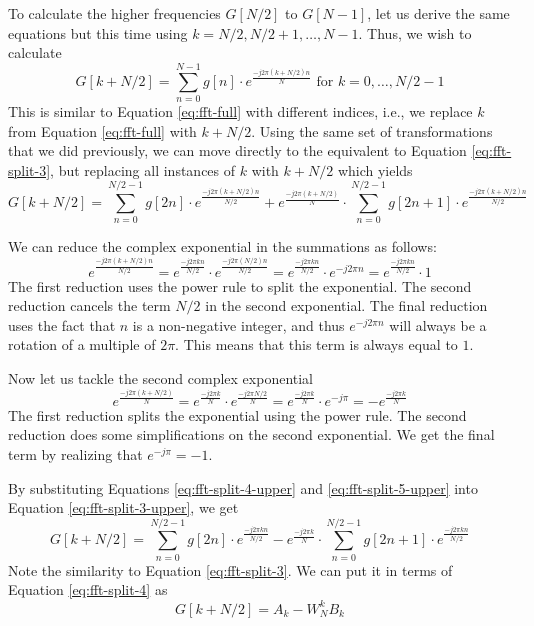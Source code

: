 To calculate the higher frequencies $G[N/2]$ to $G[N-1]$, let us derive the same equations but this time using $k = N/2, N/2 + 1, \dots, N -1$.  Thus, we wish to calculate
\begin{equation}
G[k + N/2] = \displaystyle\sum\limits_{n=0}^{N-1} g[n] \cdot e^{\frac{-j 2 \pi (k + N/2) n}{N}} \text{ for } k = 0, \dots, N/2 - 1
\label{eq:fft-upper}
\end{equation}
This is similar to Equation \ref{eq:fft-full} with different indices, i.e., we replace $k$ from Equation \ref{eq:fft-full} with $k + N/2$. Using the same set of transformations that we did previously, we can move directly to the equivalent to Equation \ref{eq:fft-split-3}, but replacing all instances of $k$ with $k + N/2$ which yields 
\begin{equation}
G[k + N/2] = \displaystyle\sum\limits_{n=0}^{N/2-1} g[2n] \cdot e^{\frac{-j 2 \pi (k + N/2) n}{N/2}} + e^{\frac{-j 2 \pi (k + N/2)}{N}} \cdot \displaystyle\sum\limits_{n=0}^{N/2-1} g[2n+1] \cdot e^{\frac{-j 2 \pi (k + N/2) n}{N/2}} 
\label{eq:fft-split-3-upper}
\end{equation}

We can reduce the complex exponential in the summations as follows:
\begin{equation}
e^{\frac{-j 2 \pi (k + N/2) n}{N/2}} = e^{\frac{-j 2 \pi k n}{N/2}} \cdot e^{\frac{-j 2 \pi (N/2) n}{N/2}} = e^{\frac{-j 2 \pi k n}{N/2}} \cdot e^{-j 2 \pi n} = e^{\frac{-j 2 \pi k n}{N/2}} \cdot 1
\label{eq:fft-split-4-upper}
\end{equation}
The first reduction uses the power rule to split the exponential. The second reduction cancels the term $N/2$ in the second exponential. The final reduction uses the fact that $n$ is a non-negative integer, and thus $e^{-j 2 \pi n}$ will always be a rotation of a multiple of $2 \pi$. This means that this term is always equal to $1$. 

Now let us tackle the second complex exponential
\begin{equation}
e^{\frac{-j 2 \pi (k + N/2)}{N}} = e^{\frac{-j 2 \pi k }{N}} \cdot e^{\frac{-j 2 \pi N/2 }{N}} = e^{\frac{-j 2 \pi k }{N}} \cdot e^{-j  \pi} = - e^{\frac{-j 2 \pi k }{N}}
\label{eq:fft-split-5-upper}
\end{equation}
The first reduction splits the exponential using the power rule. The second reduction does some simplifications on the second exponential. We get the final term by realizing that $e^{-j \pi} = -1$.

By substituting Equations \ref{eq:fft-split-4-upper} and \ref{eq:fft-split-5-upper} into Equation \ref{eq:fft-split-3-upper}, we get
\begin{equation}
G[k + N/2] = \displaystyle\sum\limits_{n=0}^{N/2-1} g[2n] \cdot e^{\frac{-j 2 \pi k n}{N/2}} - e^{\frac{-j 2 \pi k}{N}} \cdot \displaystyle\sum\limits_{n=0}^{N/2-1} g[2n+1] \cdot e^{\frac{-j 2 \pi k n}{N/2}} 
\label{eq:fft-split-6-upper}
\end{equation}
Note the similarity to Equation \ref{eq:fft-split-3}. We can put it in terms of Equation \ref{eq:fft-split-4} as
\begin{equation}
G[k + N/2] = A_k - W_N^k B_k 
\label{eq:fft-split-7-upper}
\end{equation}

